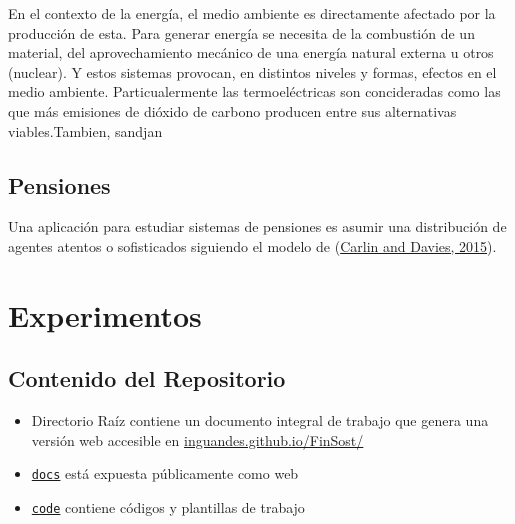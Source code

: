 \documentclass[
]{book}
\providecommand{\tightlist}{%
  \setlength{\itemsep}{0pt}\setlength{\parskip}{0pt}}
\begin{document}
En el contexto de la energía, el medio ambiente es directamente afectado por la producción de esta. Para generar energía se necesita de la combustión de un material, del aprovechamiento mecánico de una energía natural externa u otros (nuclear). Y estos sistemas provocan, en distintos niveles y formas, efectos en el medio ambiente. Particualermente las termoeléctricas son concideradas como las que más emisiones de dióxido de carbono producen entre sus alternativas viables.Tambien, sandjan

\hypertarget{pensiones}{%
\section{Pensiones}\label{pensiones}}

Una aplicación para estudiar sistemas de pensiones es asumir una distribución de agentes atentos o sofisticados siguiendo el modelo de (\protect\hyperlink{bib-carlin_implementation_2015}{Carlin and Davies, 2015}).

\hypertarget{experimentos}{%
\chapter{Experimentos}\label{experimentos}}

\hypertarget{contenido-del-repositorio}{%
\section{Contenido del Repositorio}\label{contenido-del-repositorio}}

\begin{itemize}
\tightlist
\item
  Directorio Raíz contiene un documento integral de trabajo que genera una versión web accesible en \href{https://inguandes.github.io/FinSost/}{inguandes.github.io/FinSost/}
\item
  \href{docs}{\texttt{docs}} está expuesta públicamente como web
\item
  \href{code}{\texttt{code}} contiene códigos y plantillas de trabajo
\end{itemize}

  
\end{document}
